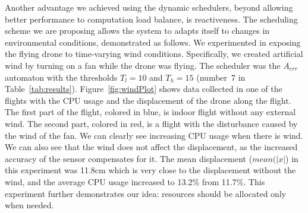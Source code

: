 \documentclass[ twoside, 12pt ]{article}
\begin{document}
Another advantage we achieved using the dynamic schedulers, beyond allowing better performance to computation load balance, is reactiveness. The  scheduling scheme we are proposing allows the system to adapts itself to changes in environmental conditions, demonstrated as follows.
We experimented in exposing the flying drone to time-varying wind conditions. 
Specifically, we created artificial wind by turning  on a fan while the drone was flying. The scheduler was the $A_{err}$ automaton with the thresholds $T_l=10$ and $T_h=15$ (number~7 in Table~\ref{tab:results}).
Figure~\ref{fig:windPlot} shows data collected in one of the flights with the CPU usage and the displacement of the drone along the flight. The first part of the flight, colored in blue, is indoor flight without any external wind. The second part, colored in red, is a flight with the disturbance caused by the wind of the fan. We can clearly see increasing CPU usage when there is wind. We can also see that the wind does not affect the displacement, as the increased accuracy of the sensor compensates for it. The mean displacement ($mean(|x|$) in this experiment was 11.8cm which is very close to the displacement without the wind, and the average CPU usage increased to  13.2\% from 11.7\%. This experiment further demonstrates our idea: resources should be allocated only when needed.
\end{document}
